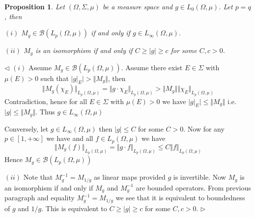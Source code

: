 \documentclass[12pt]{article}
\newtheorem{proposition}[theorem]{Proposition}
\newenvironment{proof}{\par $\triangleleft$}{$\triangleright$}
\begin{document}
\begin{proposition}\label{MulpOpPropIfPeqqualsQ} Let $(\Omega,\Sigma,\mu)$ be a
    measure space and $g\in L_0(\Omega,\mu)$. Let $p=q$, then

    $(i)$ $M_g\in\mathcal{B}(L_p(\Omega,\mu))$ if and only if $g\in
        L_\infty(\Omega,\mu)$.

    $(ii)$ $M_g$ is an isomorphism if and only if $C\geq |g|\geq c$ for some
    $C,c>0$.
\end{proposition}
\begin{proof}
    $(i)$ Assume $M_g\in\mathcal{B}(L_p(\Omega,\mu))$. Assume there exist
    $E\in\Sigma$ with $\mu(E)>0$ such that $|g|_E|>\Vert M_g\Vert$, then
    $$
        \Vert M_g(\chi_E)\Vert_{L_p(\Omega,\mu)}
        =\Vert g\cdot\chi_E\Vert_{L_p(\Omega,\mu)}
        >\Vert M_g\Vert\Vert\chi_E\Vert_{L_p(\Omega,\mu)}
    $$
    Contradiction, hence for all $E\in\Sigma$ with $\mu(E)>0$ we have
    $|g|_E|\leq \Vert M_g\Vert$ i.e.  $|g|\leq \Vert M_g\Vert$. Thus $g\in
        L_\infty(\Omega,\mu)$

    Conversely, let $g\in L_\infty(\Omega,\mu)$ then $|g|\leq C$ for some $C>0$.
    Now for any $p\in[1,+\infty]$ we have and all $f\in L_p(\Omega,\mu)$ we have
    $$
        \Vert M_g(f)\Vert_{L_p(\Omega,\mu)}
        =\Vert g\cdot f\Vert_{L_p(\Omega,\mu)}
        \leq C\Vert f\Vert_{L_p(\Omega,\mu)}
    $$
    Hence $M_g\in\mathcal{B}(L_p(\Omega,\mu))$

    $(ii)$ Note that $M_g^{-1}=M_{1/g}$ as linear maps provided $g$ is
    invertible. Now $M_g$ is an isomorphism if and only if $M_g$ and $M_g^{-1}$
    are bounded operators. From previous paragraph and equality
    $M_g^{-1}=M_{1/g}$ we see that it is equivalent to boundedness of $g$ and
    $1/g$. This is equivalent to $C\geq|g|\geq c$ for some $C,c>0$.
\end{proof}
\end{document}
